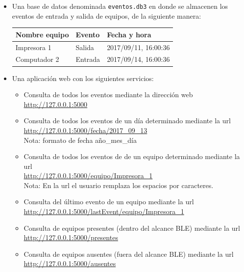 \documentclass[10pt,letterpaper]{article}
\makeatletter
\renewcommand\section{\@startsection{section}{1}{-15pt}{20pt}{10pt}{\textsc}}
\makeatother
\begin{document}
\section{Salidas}
\begin{itemize}
\item Una base de datos denominada \verb|eventos.db3| en donde se almacenen los eventos de entrada y salida de equipos, de la siguiente manera: \\
\begin{center}
\begin{tabular}{|l|l|l|}
\hline
\textbf{Nombre equipo} & \textbf{Evento} & \textbf{Fecha y hora} \\ \hline
Impresora 1            & Salida          & 2017/09/11, 16:00:36  \\ \hline
Computador 2           & Entrada         & 2017/09/14, 16:00:36   \\ \hline
\end{tabular}
\end{center}

\item Una aplicación web con los siguientes servicios:
\begin{itemize}
\item Consulta de todos los eventos mediante la dirección web \url{http://127.0.0.1:5000}
\item Consulta de todos los eventos de un día determinado mediante la url\\ \url{http://127.0.0.1:5000/fecha/2017_09_13}\\
Nota: formato de fecha año\_mes\_día
\item Consulta de todos los eventos de de un equipo determinado mediante la url\\ \url{http://127.0.0.1:5000/equipo/Impresora_1}\\
Nota: En la url el usuario remplaza los espacios por caracteres. 
\item Consulta del último evento de un equipo mediante la url\\ \url{http://127.0.0.1:5000/lastEvent/equipo/Impresora_1}\\
\item Consulta de equipos presentes (dentro del alcance BLE) mediante la url\\ \url{http://127.0.0.1:5000/presentes}\\
\item Consulta de equipos ausentes (fuera del alcance BLE) mediante la url\\ \url{http://127.0.0.1:5000/ausentes}\\
\end{itemize}

\end{itemize}
\end{document}
